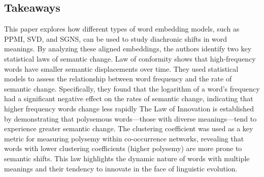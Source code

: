 \subsection{Takeaways}\label{subsec:takeaways4}
This paper explores how different types of word embedding models, such as PPMI, SVD, and SGNS, can be used to study diachronic shifts in word meanings.
By analyzing these aligned embeddings, the authors identify two key statistical laws of semantic change.
Law of conformity shows that high-frequency words have smaller semantic displacements over time.
They used statistical models to assess the relationship between word frequency and the rate of semantic change. Specifically, they found that the logarithm of a word's frequency had a significant negative effect on the rates of semantic change, indicating that higher frequency words change less rapidly
The Law of Innovation is established by demonstrating that polysemous words—those with diverse meanings—tend to experience greater semantic change. The clustering coefficient was used as a key metric for measuring polysemy within co-occurrence networks, revealing that words with lower clustering coefficients (higher polysemy) are more prone to semantic shifts. This law highlights the dynamic nature of words with multiple meanings and their tendency to innovate in the face of linguistic evolution.

